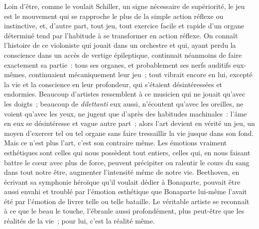 \documentclass[french,twoside]{book} %
\begin{document}
Loin d’être, comme le voulait Schiller, un signe nécessaire de supériorité, le jeu est le mouvement qui se rapproche le plus de la simple action réflexe ou instinctive, et, d’autre part, tout jeu, tout exercice facile et rapide d’un organe déterminé tend par l’habitude à se transformer en action réflexe. On connaît l’histoire de ce violoniste qui jouait  dans un orchestre et qui, ayant perdu la conscience dans un accès de vertige épileptique, continuait néanmoins de faire exactement sa partie : tous ses organes, et probablement ses nerfs auditifs eux-mêmes, continuaient mécaniquement leur jeu ; tout vibrait encore en lui, excepté la vie et la conscience en leur profondeur, qui s’étaient désintéressées et endormies. Beaucoup d’artistes ressemblent à ce musicien qui ne jouait qu’avec les doigts ; beaucoup de \emph{dilettanti} eux aussi, n’écoutent qu’avec les oreilles, ne voient qu’avec les yeux, ne jugent que d’après des habitudes machinales : l’âme en eux se désintéresse et vague autre part ; alors l’art devient en vérité un jeu, un moyen d’exercer tel ou tel organe sans faire tressaillir la vie jusque dans son fond. Mais ce n’est plus l’art, c’est son contraire même. Les émotions vraiment esthétiques sont celles qui nous possèdent tout entiers, celles qui, en nous faisant battre le cœur avec plus de force, peuvent précipiter ou ralentir le cours du sang dans tout notre être, augmenter l’intensité même de notre vie. Beethoven, en écrivant sa symphonie héroïque qu’il voulait dédier à Bonaparte, pouvait être aussi envahi et troublé par l’émotion esthétique que Bonaparte lui-même l’avait été par l’émotion de livrer telle ou telle bataille. Le véritable artiste se reconnaît à ce que le beau le touche, l’ébranle aussi profondément, plus peut-être que les réalités de la vie ; pour lui, c’est la réalité même.\par
\end{document}
